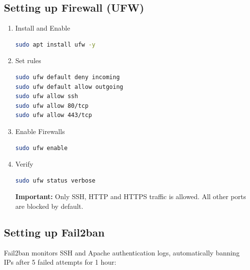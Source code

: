 \documentclass[12pt,a4paper]{report}
\begin{document}
\subsection{Setting up Firewall (UFW)}
\begin{enumerate}
\item Install and Enable
\begin{lstlisting}[language=bash]
sudo apt install ufw -y
\end{lstlisting}

\item Set rules
\begin{lstlisting}[language=bash]
sudo ufw default deny incoming
sudo ufw default allow outgoing
sudo ufw allow ssh
sudo ufw allow 80/tcp
sudo ufw allow 443/tcp
\end{lstlisting}

\item Enable Firewalls
\begin{lstlisting}[language=bash]
sudo ufw enable
\end{lstlisting}

\item Verify
\begin{lstlisting}[language=bash]
sudo ufw status verbose
\end{lstlisting}
\begin{markdownnote}
\textbf{Important:} Only SSH, HTTP and HTTPS traffic is allowed. All other ports are blocked by default.
\end{markdownnote}

\end{enumerate}
\newpage

\subsection{Setting up Fail2ban}

Fail2ban monitors SSH and Apache authentication logs, automatically banning IPs after 5 failed attempts for 1 hour:
\end{document}
